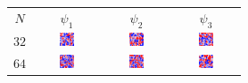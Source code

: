 \documentclass{article}
\begin{document}
\begin{figure}[ht]
\begin{tabular}{cccc}
$N$ & $\psi_1$ & $\psi_2$ & $\psi_3$ \\
$32$ & 
\includegraphics[width=0.24\textwidth]{s42r32s20psi1_phase.png} &
\includegraphics[width=0.24\textwidth]{s42r32s20psi2_phase.png} &
\includegraphics[width=0.24\textwidth]{s42r32s20psi3_phase.png} \\
$64$ & 
\includegraphics[width=0.24\textwidth]{s42r64s20psi1_phase.png} &
\includegraphics[width=0.24\textwidth]{s42r64s20psi2_phase.png} &
\includegraphics[width=0.24\textwidth]{s42r64s20psi3_phase.png} \\

\end{tabular}
\end{figure}
\end{document}
